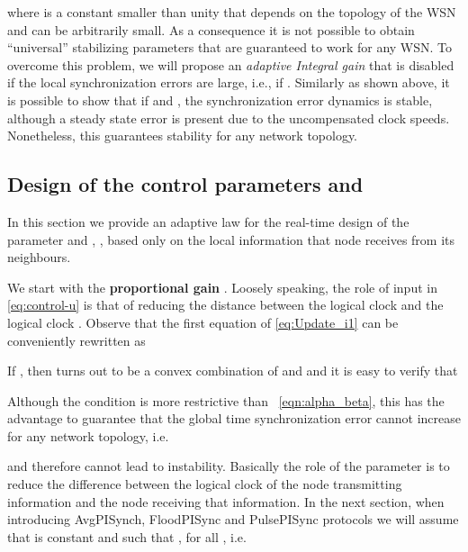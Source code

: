\documentclass[english,a4paper,10pt,final]{article}
\numberwithin{equation}{section}
\numberwithin{figure}{section}
\begin{document}
where  is a constant smaller than unity that depends on the topology of the WSN and can be arbitrarily small. As a consequence it is not possible to obtain ``universal'' stabilizing parameters that are guaranteed to work for any WSN. To overcome this problem, we will propose an \emph{adaptive Integral gain} that is disabled if the local synchronization errors are large, i.e.,  if . Similarly as shown above, it is possible to show that if  and , the synchronization error dynamics is stable, although a steady state error is present due to the uncompensated clock speeds. Nonetheless, this guarantees stability for any network topology.   


\subsection{Design of the control parameters  and }
\label{sec:parameter-adaptation}

In this section we provide an adaptive law for the real-time design of the parameter  and , , based only on the local information that node  receives from its neighbours. 

We start with the \textbf{proportional gain} . Loosely speaking, the role of input  in \eqref{eq:control-u} is that of reducing the distance between the logical clock  and the logical clock . Observe that the first equation of \eqref{eq:Update_i1} can be conveniently rewritten as

If 
, then  turns out to be a convex combination of  and  and it is easy to verify that

Although the condition  is more restrictive than ~\eqref{eqn:alpha_beta}, this has the advantage to guarantee that the global time synchronization error cannot increase for any network topology, i.e.

 and therefore cannot lead to instability. Basically the role of the parameter  is to reduce the difference between the logical clock of the node transmitting information and the node receiving that information.
 In the next section, when introducing AvgPISynch, FloodPISync and PulsePISync protocols we will assume that  is constant and such that , for all , i.e.
 
\end{document}
